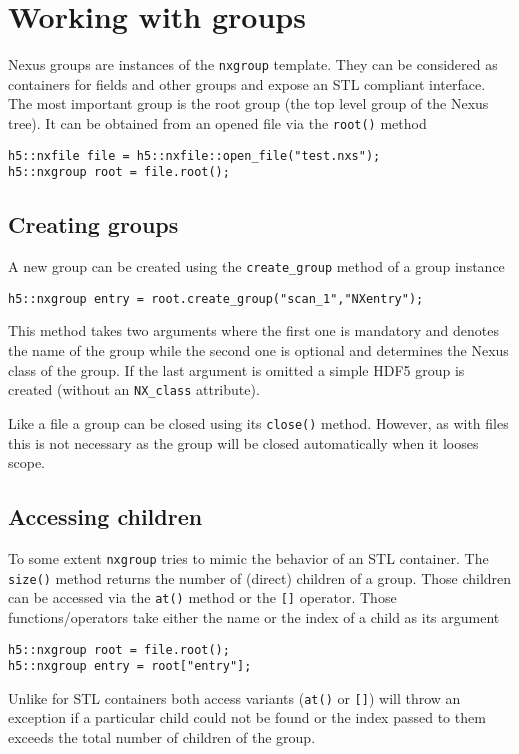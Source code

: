 \section{Working with groups}

Nexus groups are instances of the {\tt nxgroup} template. They can be considered
as containers for fields and other groups and expose an STL compliant interface. 
The most important group is the root group (the top level group of the Nexus
tree). It can be obtained from an opened file via the {\tt root()} method
\begin{verbatim}
h5::nxfile file = h5::nxfile::open_file("test.nxs");
h5::nxgroup root = file.root();
\end{verbatim}

\subsection{Creating groups}

A new group can be created using the {\tt create\_group} method of a group
instance
\begin{verbatim}
h5::nxgroup entry = root.create_group("scan_1","NXentry");
\end{verbatim}
This method takes two arguments where the first one is mandatory and denotes the
name of the group while the second one is optional and determines the Nexus
class of the group. If the last argument is omitted a simple HDF5 group is
created (without an {\tt NX\_class}  attribute).

Like a file a group can be closed using its {\tt close()} method. However, as
with files this is not necessary as the group will be closed automatically when
it looses scope.

\subsection{Accessing children}

To some extent {\tt nxgroup} tries to mimic the behavior of an STL container. 
The {\tt size()} method returns the number of (direct) children of a group. 
Those children can be accessed via the {\tt at()} method or the
{\tt []} operator. Those functions/operators take either the name or the index 
of a child as its argument
\begin{verbatim}
h5::nxgroup root = file.root();
h5::nxgroup entry = root["entry"];
\end{verbatim}
Unlike for STL containers both access variants ({\tt at()} or {\tt []}) will 
throw an exception if a particular child could not be found or the index passed
to them exceeds the total number of children of the group.

